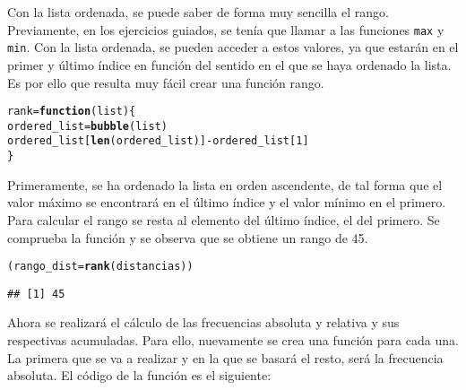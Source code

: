 \documentclass[12pt]{report}\usepackage[]{graphicx}\usepackage[dvipsnames]{xcolor}
\makeatletter
\newcommand{\hlnum}[1]{\textcolor[rgb]{0.686,0.059,0.569}{#1}}%
\newcommand{\hlopt}[1]{\textcolor[rgb]{0,0,0}{#1}}%
\newcommand{\hlstd}[1]{\textcolor[rgb]{0.345,0.345,0.345}{#1}}%
\newcommand{\hlkwa}[1]{\textcolor[rgb]{0.161,0.373,0.58}{\textbf{#1}}}%
\newcommand{\hlkwb}[1]{\textcolor[rgb]{0.69,0.353,0.396}{#1}}%
\newcommand{\hlkwc}[1]{\textcolor[rgb]{0.333,0.667,0.333}{#1}}%
\newcommand{\hlkwd}[1]{\textcolor[rgb]{0.737,0.353,0.396}{\textbf{#1}}}%
\newenvironment{kframe}{%
 \def\at@end@of@kframe{}%
 \ifinner\ifhmode%
  \def\at@end@of@kframe{\end{minipage}}%
  \begin{minipage}{\columnwidth}%
 \fi\fi%
 \def\FrameCommand##1{\hskip\@totalleftmargin \hskip-\fboxsep
 \colorbox{shadecolor}{##1}\hskip-\fboxsep
     \hskip-\linewidth \hskip-\@totalleftmargin \hskip\columnwidth}%
 \MakeFramed {\advance\hsize-\width
   \@totalleftmargin\z@ \linewidth\hsize
   \@setminipage}}%
 {\par\unskip\endMakeFramed%
 \at@end@of@kframe}
\newenvironment{knitrout}{}{} %
\makeatother
\begin{document}
			Con la lista ordenada, se puede saber de forma muy sencilla el rango. Previamente, en los ejercicios guiados, se tenía que llamar a las funciones \texttt{max} y \texttt{min}. Con la lista ordenada, se pueden acceder a estos valores, ya que estarán en el primer y último índice en función del sentido en el que se haya ordenado la lista. Es por ello que resulta muy fácil crear una función rango.
			
\begin{knitrout}
\color{fgcolor}\begin{kframe}
\begin{alltt}
\hlstd{rank} \hlkwb{=} \hlkwa{function}\hlstd{(}\hlkwc{list}\hlstd{) \{}
        \hlstd{ordered_list} \hlkwb{=} \hlkwd{bubble}\hlstd{(list)}
        \hlstd{ordered_list[}\hlkwd{len}\hlstd{(ordered_list)]} \hlopt{-} \hlstd{ordered_list[}\hlnum{1}\hlstd{]}
\hlstd{\}}
\end{alltt}
\end{kframe}
\end{knitrout}
			
			Primeramente, se ha ordenado la lista en orden ascendente, de tal forma que el valor máximo se encontrará en el último índice y el valor mínimo en el primero. Para calcular el rango se resta al elemento del último índice, el del primero. Se comprueba la función y se observa que se obtiene un rango de 45.
			
\begin{knitrout}
\color{fgcolor}\begin{kframe}
\begin{alltt}
\hlstd{(rango_dist} \hlkwb{=} \hlkwd{rank}\hlstd{(distancias))}
\end{alltt}
\begin{verbatim}
## [1] 45
\end{verbatim}
\end{kframe}
\end{knitrout}
			
			Ahora se realizará el cálculo de las frecuencias absoluta y relativa y sus respectivas acumuladas. Para ello, nuevamente se crea una función para cada una. La primera que se va a realizar y en la que se basará el resto, será la frecuencia absoluta. El código de la función es el siguiente:
			
\end{document}
